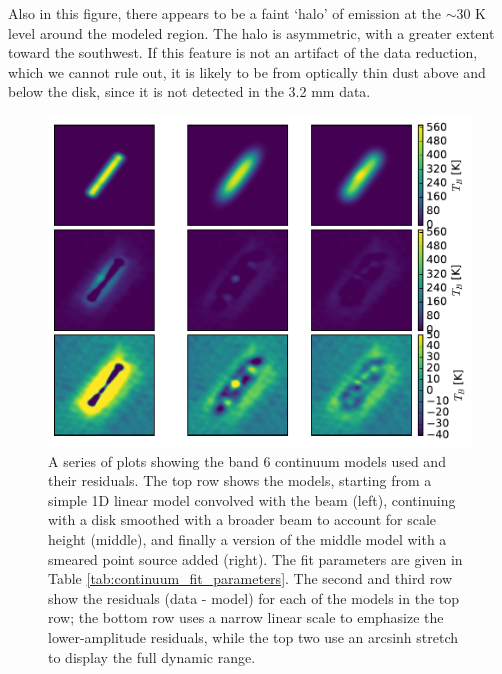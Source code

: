 \documentclass[twocolumn]{aastex61}
\begin{document}
Also in this figure, there appears to be a faint `halo' of emission at the
$\sim30$ K level around the modeled region.  The halo is asymmetric, with a
greater extent toward the southwest.  If this feature is not an artifact of the
data reduction, which we cannot rule out, it is likely to be from optically
thin dust above and below the disk, since it is not detected in the 3.2 mm data.



\begin{figure}[!htp]
\includegraphics[scale=1,width=7.5in]{figures/models_and_residuals_B6.pdf}
\caption{A series of plots showing the band 6 continuum models used and their residuals.
The top row shows the models, starting from a simple 1D linear model convolved
with the beam (left), continuing with a disk smoothed with a broader beam to
account for scale height (middle), and finally a version of the middle model
with a smeared point source added (right).  The fit parameters are given in Table
\ref{tab:continuum_fit_parameters}.  The second and third row show the
residuals (data - model) for each of the models in the top row; the bottom row
uses a narrow linear scale to emphasize the lower-amplitude residuals, while
the top two use an arcsinh stretch to display the full dynamic range.
}
\label{fig:contmodel_residuals_B6}
\end{figure}
\end{document}
